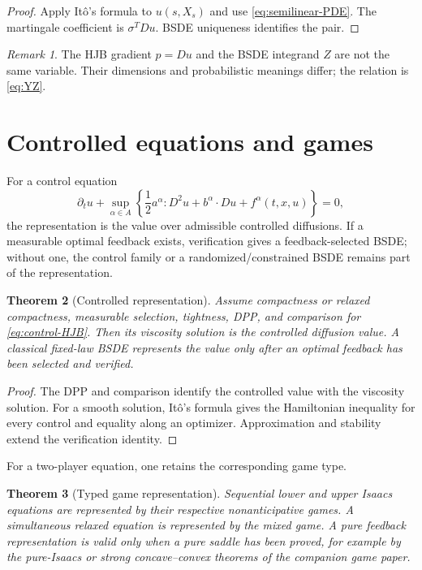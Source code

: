 \documentclass[11pt,reqno]{amsart}
\newtheorem{theorem}{Theorem}[section]
\theoremstyle{definition}
\theoremstyle{remark}
\newtheorem{remark}[theorem]{Remark}
\begin{document}
\begin{proof}
Apply It\^o's formula to $u(s,X_s)$ and use
\eqref{eq:semilinear-PDE}.  The martingale coefficient is
$\sigma^TDu$.  BSDE uniqueness identifies the pair.
\end{proof}

\begin{remark}
The HJB gradient $p=Du$ and the BSDE integrand $Z$ are not the same variable.
Their dimensions and probabilistic meanings differ; the relation is
\eqref{eq:YZ}.
\end{remark}

\section{Controlled equations and games}\label{sec:control-game}

For a control equation
\begin{equation}\label{eq:control-HJB}
 \partial_tu+\sup_{\alpha\in A}\left\{
 \frac12a^\alpha:D^2u+b^\alpha\cdot Du
 +f^\alpha(t,x,u)\right\}=0,
\end{equation}
the representation is the value over admissible controlled diffusions.  If a
measurable optimal feedback exists, verification gives a feedback-selected
BSDE; without one, the control family or a randomized/constrained BSDE remains
part of the representation.

\begin{theorem}[Controlled representation]\label{thm:control}
Assume compactness or relaxed compactness, measurable selection, tightness,
DPP, and comparison for \eqref{eq:control-HJB}.  Then its viscosity solution is
the controlled diffusion value.  A classical fixed-law BSDE represents the
value only after an optimal feedback has been selected and verified.
\end{theorem}

\begin{proof}
The DPP and comparison identify the controlled value with the viscosity
solution.  For a smooth solution, It\^o's formula gives the Hamiltonian
inequality for every control and equality along an optimizer.  Approximation
and stability extend the verification identity.
\end{proof}

For a two-player equation, one retains the corresponding game type.

\begin{theorem}[Typed game representation]\label{thm:game-type}
Sequential lower and upper Isaacs equations are represented by their respective
nonanticipative games.  A simultaneous relaxed equation is represented by the
mixed game.  A pure feedback representation is valid only when a pure saddle
has been proved, for example by the pure-Isaacs or strong concave--convex
theorems of the companion game paper.
\end{theorem}
\end{document}
